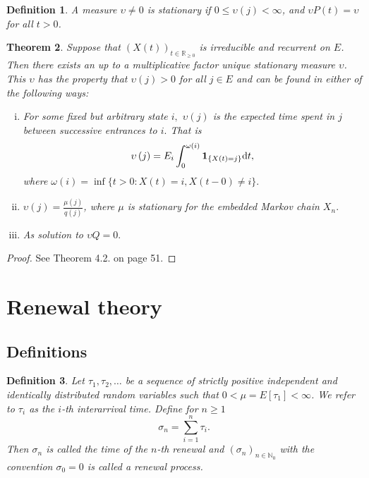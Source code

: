 \documentclass[12pt,a4paper]{scrartcl}
\newtheorem{theorem}{Theorem}[section]
\newtheorem{definition}[theorem]{Definition}
\numberwithin{equation}{section}
\newcommand{\R}{\mathbb{R}} %
\newcommand{\N}{\mathbb{N}} %
\begin{document}
\begin{definition}
A measure $\upsilon \neq 0$ is stationary if $ 0 \leq \upsilon\left(j\right) < \infty $, and $\upsilon P\left(t\right) = \upsilon $ for all $t > 0$.
\end{definition}

\begin{theorem}
\label{stationarymeasuretheorem}
Suppose that $\left(X\left(t\right)\right)_{t \in \R_{\geq 0}}$ is irreducible and recurrent on $E$. Then there exists an up to a multiplicative factor unique stationary measure $\upsilon$. This $\upsilon$ has the property that $ \upsilon\left(j\right) > 0 $ for all $ j \in E $ and can be found in either of the following ways:
\begin{enumerate}[(i)]
\item For some fixed but arbitrary state $i,$ $\upsilon\left(j\right)$ is the expected time spent in $j$ between successive entrances to $i.$ That is
\begin{equation}
\upsilon\left(j\right) = E_i \int_0^{\omega\left(i\right)} \textbf{1}_{\lbrace X\left(t\right) = j \rbrace} \textnormal{d}t,
\end{equation}
where $\omega\left(i\right) = \inf\lbrace t > 0: X\left(t\right) = i, X\left(t-0\right) \neq i \rbrace.$
\item $\upsilon\left(j\right) = \frac{\mu\left(j\right)}{q\left(j\right)}$, where $\mu$ is stationary for the embedded Markov chain $X_n.$
\item As solution to $\upsilon Q = 0.$
\end{enumerate}
\end{theorem}
\begin{proof}
See \cite{asmussen} Theorem 4.2. on page 51.
\end{proof}

\section{Renewal theory}

\subsection{Definitions}
\begin{definition}
Let $ \tau_1, \tau_2, \ldots $ be a sequence of strictly positive independent and identically distributed random variables such that $ 0 < \mu = E\left[\tau_1\right] < \infty $. We refer to $ \tau_i $ as the $i$-th interarrival time. Define for $ n \geq 1 $ 
$$ \sigma_n = \sum_{i=1}^n \tau_i. $$
Then $ \sigma_n $ is called the time of the $n$-th renewal and $\left(\sigma_n\right)_{n \in \N_0} $ with the convention $\sigma_0 = 0$ is called a renewal process.
\end{definition}
\end{document}
